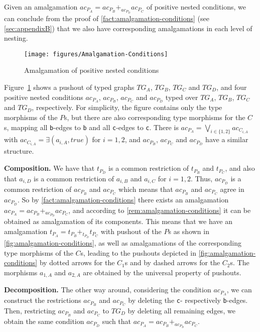 \begin{remark}\label{rem:amalgamation-conditions}
	Given an amalgamation $ac_{P_A} = ac_{P_B} +_{ac_{P_D}} ac_{P_C}$ of positive nested conditions, we can conclude from the proof of \autoref{fact:amalgamation-conditions} (see \autoref{sec:appendixB}) that we also have corresponding amalgamations in each
	level of nesting.
\end{remark}

\begin{figure}[htb]\centering
\texttt{[image: figures/Amalgamation-Conditions]}
\caption{Amalgamation of positive nested conditions}\label{fig:amalgamation-conditions}
\end{figure}


\begin{example}\label{ex:amalgamation-conditions}
	Figure~\ref{fig:amalgamation-conditions} shows a pushout of typed graphs $TG_A$, $TG_B$, $TG_C$ and $TG_D$, and four positive nested conditions
	$ac_{P_A}$, $ac_{P_B}$, $ac_{P_C}$ and $ac_{P_D}$ typed over $TG_A$, $TG_B$, $TG_C$ and $TG_D$, respectively. For simplicity, the figure
	contains only the type morphisms of the $P$s, but there are also corresponding type morphisms for the $C$s, mapping all \texttt{b}-edges to
	\texttt{b} and all \texttt{c}-edges to \texttt{c}. 
	There is $ac_{P_A} = \bigvee_{i \in \{1,2\}} ac_{C_{i,A}}$ with $ac_{C_{i,A}} = \exists(a_{i,A}, true)$ for $i = 1,2$, and $ac_{P_B}$,
	$ac_{P_C}$ and $ac_{P_D}$ have a similar structure.
	\begin{description}
		\item \textbf{Composition.}
			We have that $t_{P_D}$ is a common restriction of $t_{P_B}$ and $t_{P_C}$, and also that $a_{i,D}$ is a common
			restriction of $a_{i,B}$ and $a_{i,C}$ for $i=1,2$. Thus, $ac_{P_D}$ is a common restriction of $ac_{P_B}$ and $ac_{P_C}$
			which means that $ac_{P_B}$ and $ac_{P_C}$ agree in $ac_{P_D}$. So by \autoref{fact:amalgamation-conditions} there
			exists an amalgamation $ac_{P_A} = ac_{P_B} +_{ac_{P_D}} ac_{P_C}$, and according to \autoref{rem:amalgamation-conditions}
			it can be obtained as amalgamation of its components. This means that we have an amalgamation 
			$t_{P_A} = t_{P_B} +_{t_{P_D}} t_{P_C}$ with pushout of the $P$s as shown in \autoref{fig:amalgamation-conditions},
			as well as amalgamations of the corresponding type morphisms of the $C$s, leading to the
			pushouts depicted in \autoref{fig:amalgamation-conditions} by dotted arrows for the $C_1$s and by dashed arrows for the $C_2$s.
			The morphisms $a_{1,A}$ and $a_{2,A}$ are obtained by the universal property of pushouts.
		\item \textbf{Decomposition.}
			The other way around, considering the condition $ac_{P_A}$, we can construct the restrictions $ac_{P_B}$ and $ac_{P_C}$ by deleting
			the \texttt{c}- respectively \texttt{b}-edges. Then, restricting $ac_{P_B}$ and $ac_{P_C}$ to $TG_D$ by deleting all remaining edges,
			we obtain the same condition $ac_{P_D}$ such that $ac_{P_A} = ac_{P_B} +_{ac_{P_D}} ac_{P_C}$.
	\end{description}
\end{example}


